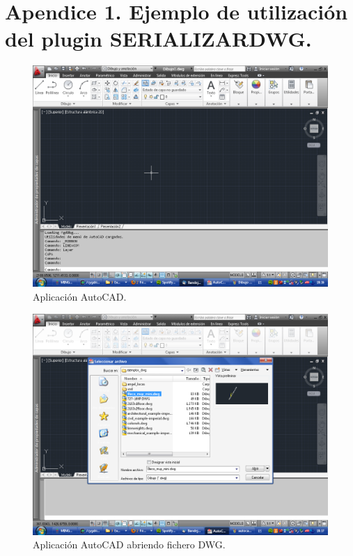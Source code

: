 \section{Apendice 1. Ejemplo de utilización del plugin SERIALIZARDWG.}

\begin{figure}[h]
\begin{center}
\includegraphics[width=\textwidth]{imgs/autocad0}
\caption{Aplicación AutoCAD.}
\end{center}
\end{figure}


\begin{figure}[h]
\begin{center}
\includegraphics[width=\textwidth]{imgs/autocad1}
\caption{Aplicación AutoCAD abriendo fichero DWG.}
\end{center}
\end{figure}

